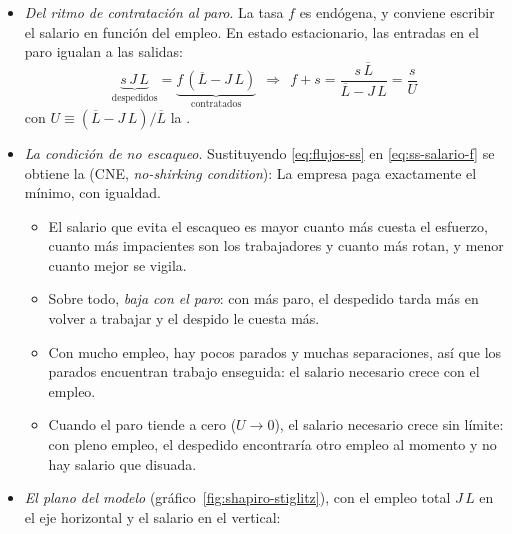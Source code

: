 \documentclass[11pt]{article}
\begin{document}
\begin{itemize}
  \begin{itemize}
  \item Es mayor cuanto mayores son el coste del esfuerzo ($\overline{e}$), la facilidad para encontrar empleo ($f$), la tasa de separación ($s$) y la de descuento ($\rho$).
  \item Es menor cuanto más fácil es descubrir a quien se escaquea ($q$).
  \item Cuanto antes vuelve a trabajar un despedido, menos le castiga el despido y más hay que pagarle.
  \end{itemize}
\item \emph{Del ritmo de contratación al paro}. La tasa $f$ es endógena, y conviene escribir el salario en función del empleo. En estado estacionario, las entradas en el paro igualan a las salidas:
  \begin{equation}
  \underbrace{s\,J\,L}_{\text{despedidos}}=\underbrace{f\,(\overline{L}-J\,L)}_{\text{contratados}}\ \ \Longrightarrow\ \ f+s=\frac{s\,\overline{L}}{\overline{L}-J\,L}=\frac{s}{U} \label{eq:flujos-ss}
  \end{equation}
  con $U\equiv(\overline{L}-J\,L)/\overline{L}$ la .
\item \emph{La condición de no escaqueo}. Sustituyendo \eqref{eq:flujos-ss} en \eqref{eq:ss-salario-f} se obtiene la  (CNE, \emph{no-shirking condition}):
  La empresa paga exactamente el mínimo, con igualdad.
  \begin{itemize}
  \item El salario que evita el escaqueo es mayor cuanto más cuesta el esfuerzo, cuanto más impacientes son los trabajadores y cuanto más rotan, y menor cuanto mejor se vigila.
  \item Sobre todo, \emph{baja con el paro}: con más paro, el despedido tarda más en volver a trabajar y el despido le cuesta más.
  \item Con mucho empleo, hay pocos parados y muchas separaciones, así que los parados encuentran trabajo enseguida: el salario necesario crece con el empleo.
  \item Cuando el paro tiende a cero ($U\to 0$), el salario necesario crece sin límite: con pleno empleo, el despedido encontraría otro empleo al momento y no hay salario que disuada.
  \end{itemize}
\item \emph{El plano del modelo} (gráfico~\ref{fig:shapiro-stiglitz}), con el empleo total $J\,L$ en el eje horizontal y el salario en el vertical:

\end{itemize}
\end{document}
